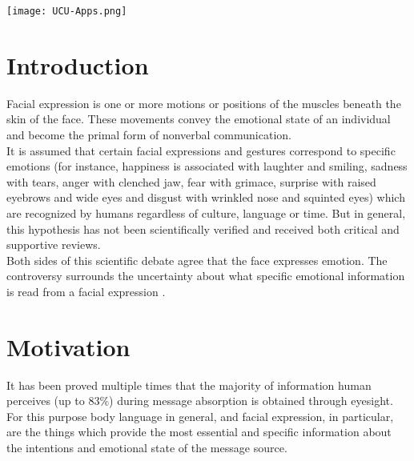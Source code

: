 \begin{titlepage}

\texttt{[image: UCU-Apps.png]}\\[1cm] %
 

\vfill %

\end{titlepage}


	

\section{Introduction}

Facial expression is one or more motions or positions of the muscles beneath the skin of the face. These movements convey the emotional state of an individual and become the primal form of nonverbal communication.\\

It is assumed that certain facial expressions and gestures correspond to specific emotions (for instance, happiness is associated with laughter and smiling, sadness with tears, anger with clenched jaw, fear with grimace, surprise with raised eyebrows and wide eyes and disgust with wrinkled nose and squinted eyes) which  are recognized by humans regardless of culture, language or time. But in general, this hypothesis has not been scientifically verified and received both critical and supportive reviews.\\

Both sides of this scientific debate agree that the face expresses emotion. The controversy surrounds the uncertainty about what specific emotional information is read from a facial expression \cite{wiki}.


\section{Motivation}

It has been proved multiple times that the majority of information human perceives (up to $83\%$) during message absorption is obtained through eyesight. For this purpose body language in general, and facial expression, in particular, are the things which provide the most essential and specific information about the intentions and emotional state of the message source.\\

